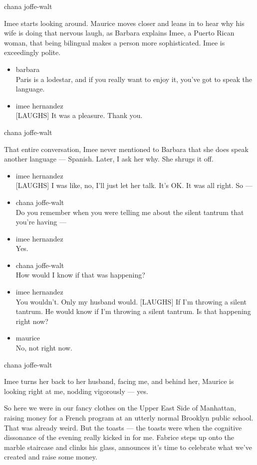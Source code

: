 chana joffe-walt

Imee starts looking around. Maurice moves closer and leans in to hear
why his wife is doing that nervous laugh, as Barbara explains Imee, a
Puerto Rican woman, that being bilingual makes a person more
sophisticated. Imee is exceedingly polite.

\begin{itemize}
\item
  barbara\\
  Paris is a lodestar, and if you really want to enjoy it, you've got to
  speak the language.
\item
  imee hernandez\\
  {[}LAUGHS{]} It was a pleasure. Thank you.
\end{itemize}

chana joffe-walt

That entire conversation, Imee never mentioned to Barbara that she does
speak another language --- Spanish. Later, I ask her why. She shrugs it
off.

\begin{itemize}
\item
  imee hernandez\\
  {[}LAUGHS{]} I was like, no, I'll just let her talk. It's OK. It was
  all right. So ---
\item
  chana joffe-walt\\
  Do you remember when you were telling me about the silent tantrum that
  you're having ---
\item
  imee hernandez\\
  Yes.
\item
  chana joffe-walt\\
  How would I know if that was happening?
\item
  imee hernandez\\
  You wouldn't. Only my husband would. {[}LAUGHS{]} If I'm throwing a
  silent tantrum. He would know if I'm throwing a silent tantrum. Is
  that happening right now?
\item
  maurice\\
  No, not right now.
\end{itemize}

chana joffe-walt

Imee turns her back to her husband, facing me, and behind her, Maurice
is looking right at me, nodding vigorously --- yes.

So here we were in our fancy clothes on the Upper East Side of
Manhattan, raising money for a French program at an utterly normal
Brooklyn public school. That was already weird. But the toasts --- the
toasts were when the cognitive dissonance of the evening really kicked
in for me. Fabrice steps up onto the marble staircase and clinks his
glass, announces it's time to celebrate what we've created and raise
some money.

